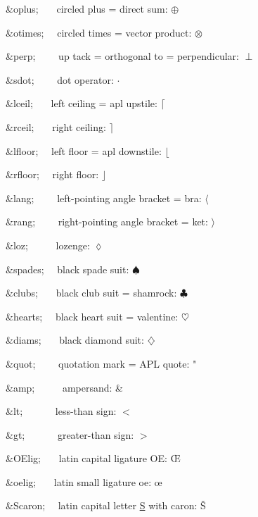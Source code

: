 \begin{DoxyItemize}
\item {\ttfamily \&oplus;}{\ttfamily ~~~} circled plus = direct sum\+: {$\oplus$} 
\item {\ttfamily \&otimes;}{\ttfamily ~~} circled times = vector product\+: {$\otimes$} 
\item {\ttfamily \&perp;}{\ttfamily ~~~~} up tack = orthogonal to = perpendicular\+: {$\perp$} 
\item {\ttfamily \&sdot;}{\ttfamily ~~~~} dot operator\+: {$\cdot$} 
\item {\ttfamily \&lceil;}{\ttfamily ~~~} left ceiling = apl upstile\+: {$\lceil$} 
\item {\ttfamily \&rceil;}{\ttfamily ~~~} right ceiling\+: {$\rceil$} 
\item {\ttfamily \&lfloor;}{\ttfamily ~~} left floor = apl downstile\+: {$\lfloor$} 
\item {\ttfamily \&rfloor;}{\ttfamily ~~} right floor\+: {$\rfloor$} 
\item {\ttfamily \&lang;}{\ttfamily ~~~~} left-\/pointing angle bracket = bra\+: {$\langle$} 
\item {\ttfamily \&rang;}{\ttfamily ~~~~} right-\/pointing angle bracket = ket\+: {$\rangle$} 
\item {\ttfamily \&loz;}{\ttfamily ~~~~~} lozenge\+: {$\lozenge$} 
\item {\ttfamily \&spades;}{\ttfamily ~~} black spade suit\+: {$\spadesuit$} 
\item {\ttfamily \&clubs;}{\ttfamily ~~~} black club suit = shamrock\+: {$\clubsuit$} 
\item {\ttfamily \&hearts;}{\ttfamily ~~} black heart suit = valentine\+: {$\heartsuit$} 
\item {\ttfamily \&diams;}{\ttfamily ~~~} black diamond suit\+: {$\diamondsuit$} 
\item {\ttfamily \&quot;}{\ttfamily ~~~~} quotation mark = A\+PL quote\+: " 
\item {\ttfamily \&amp;}{\ttfamily ~~~~~} ampersand\+: \& 
\item {\ttfamily \&lt;}{\ttfamily ~~~~~~} less-\/than sign\+: $<$ 
\item {\ttfamily \&gt;}{\ttfamily ~~~~~~} greater-\/than sign\+: $>$ 
\item {\ttfamily \&O\+Elig;}{\ttfamily ~~~} latin capital ligature OE\+: \OE 
\item {\ttfamily \&oelig;}{\ttfamily ~~~} latin small ligature oe\+: \oe 
\item {\ttfamily \&Scaron;}{\ttfamily ~~} latin capital letter \mbox{\hyperlink{struct_s}{S}} with caron\+: \v{S} 

\end{DoxyItemize}
